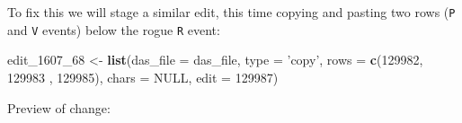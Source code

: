 \documentclass[
]{book}
\newenvironment{Shaded}{\begin{snugshade}}{\end{snugshade}}
\newcommand{\DataTypeTok}[1]{\textcolor[rgb]{0.13,0.29,0.53}{#1}}
\newcommand{\DecValTok}[1]{\textcolor[rgb]{0.00,0.00,0.81}{#1}}
\newcommand{\KeywordTok}[1]{\textcolor[rgb]{0.13,0.29,0.53}{\textbf{#1}}}
\newcommand{\NormalTok}[1]{#1}
\newcommand{\OtherTok}[1]{\textcolor[rgb]{0.56,0.35,0.01}{#1}}
\newcommand{\StringTok}[1]{\textcolor[rgb]{0.31,0.60,0.02}{#1}}
\begin{document}
To fix this we will stage a similar edit, this time copying and pasting two rows (\texttt{P} and \texttt{V} events) below the rogue \texttt{R} event:

\begin{Shaded}
\begin{Highlighting}[]
\NormalTok{edit_}\DecValTok{1607}\NormalTok{_}\DecValTok{68}\NormalTok{ <-}\StringTok{ }
\StringTok{  }\KeywordTok{list}\NormalTok{(}\DataTypeTok{das_file =}\NormalTok{ das_file, }
       \DataTypeTok{type =} \StringTok{'copy'}\NormalTok{,}
       \DataTypeTok{rows =} \KeywordTok{c}\NormalTok{(}\DecValTok{129982}\NormalTok{, }\DecValTok{129983}\NormalTok{ , }\DecValTok{129985}\NormalTok{),}
       \DataTypeTok{chars =} \OtherTok{NULL}\NormalTok{,}
       \DataTypeTok{edit =} \DecValTok{129987}\NormalTok{)}
\end{Highlighting}
\end{Shaded}

Preview of change:
\end{document}
